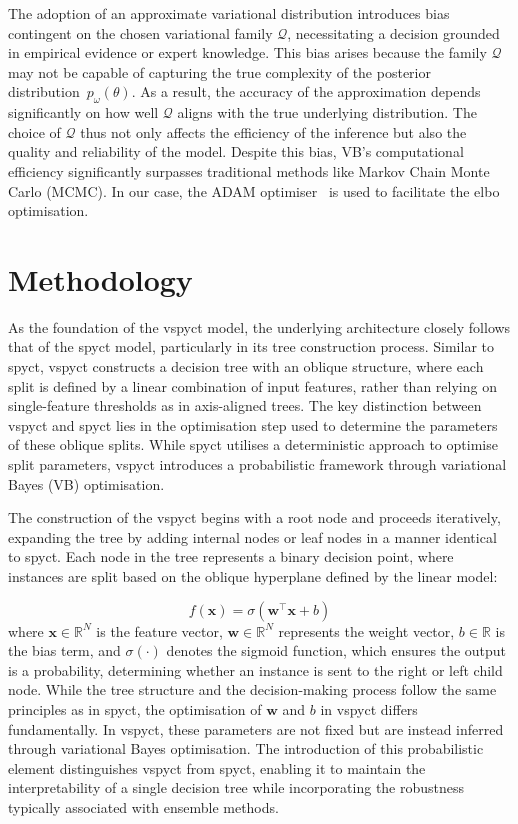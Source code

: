 \documentclass[3p,review,authoryear]{elsarticle}
\begin{document}
The adoption of an approximate variational distribution introduces bias contingent on the chosen variational family $\mathcal{Q}$, necessitating a decision grounded in empirical evidence or expert knowledge.
This bias arises because the family \(\mathcal{Q}\) may not be capable of capturing the true complexity of the posterior distribution~\(p_\omega(\theta)\).
As a result, the accuracy of the approximation depends significantly on how well \(\mathcal{Q}\) aligns with the true underlying distribution.
The choice of \(\mathcal{Q}\) thus not only affects the efficiency of the inference but also the quality and reliability of the model.
Despite this bias, VB's computational efficiency significantly surpasses traditional methods like Markov Chain Monte Carlo (MCMC).
In our case, the ADAM optimiser~\citep{kingma2014adam} is used to facilitate the \gls{elbo} optimisation.


\section{Methodology}

As the foundation of the \gls{vspyct} model, the underlying architecture closely follows that of the \gls{spyct} model, particularly in its tree construction process.
Similar to \gls{spyct}, \gls{vspyct} constructs a decision tree with an oblique structure, where each split is defined by a linear combination of input features, rather than relying on single-feature thresholds as in axis-aligned trees.
The key distinction between \gls{vspyct} and \gls{spyct} lies in the optimisation step used to determine the parameters of these oblique splits.
While \gls{spyct} utilises a deterministic approach to optimise split parameters, \gls{vspyct} introduces a probabilistic framework through variational Bayes (VB) optimisation.

The construction of the \gls{vspyct} begins with a root node and proceeds iteratively, expanding the tree by adding internal nodes or leaf nodes in a manner identical to \gls{spyct}. Each node in the tree represents a binary decision point, where instances are split based on the oblique hyperplane defined by the linear model:

\begin{equation}
f(\mathbf{x}) = \sigma \left(\mathbf{w}^\top \mathbf{x} + b \right)
\label{eq:linear_model}
\end{equation}
where \(\mathbf{x} \in \mathbb{R}^N\) is the feature vector, \(\mathbf{w} \in \mathbb{R}^N\) represents the weight vector, \(b \in \mathbb{R}\) is the bias term, and \(\sigma(\cdot)\) denotes the sigmoid function, which ensures the output is a probability, determining whether an instance is sent to the right or left child node.
While the tree structure and the decision-making process follow the same principles as in \gls{spyct}, the optimisation of \(\mathbf{w}\) and \(b\) in \gls{vspyct} differs fundamentally.
In \gls{vspyct}, these parameters are not fixed but are instead inferred through variational Bayes optimisation.
The introduction of this probabilistic element distinguishes \gls{vspyct} from \gls{spyct}, enabling it to maintain the interpretability of a single decision tree while incorporating the robustness typically associated with ensemble methods.
\end{document}
